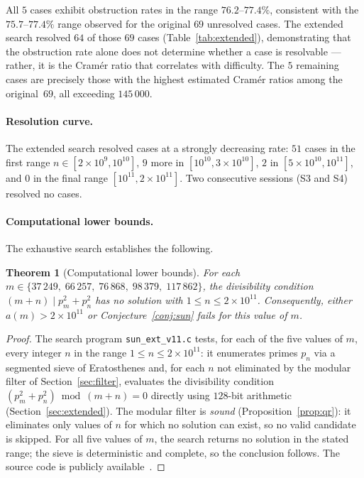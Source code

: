 \documentclass[pdflatex,sn-mathphys-num,Numbered]{sn-jnl}
\theoremstyle{thmstyleone}
\newtheorem{theorem}{Theorem}[section]
\theoremstyle{thmstylethree}
\theoremstyle{thmstyletwo}
\numberwithin{equation}{section}
\begin{document}
All $5$ cases exhibit obstruction rates in the range $76.2$--$77.4\%$,
consistent with the $75.7$--$77.4\%$ range observed for the original
$69$ unresolved cases.
The extended search resolved $64$ of those $69$ cases
(Table~\ref{tab:extended}), demonstrating that the obstruction rate
alone does not determine whether a case is resolvable --- rather, it is
the Cram\'er ratio that correlates with difficulty.
The $5$ remaining cases are precisely those with the highest estimated
Cram\'er ratios among the original~$69$, all exceeding $145\,000$.

\paragraph{Resolution curve.}
The extended search resolved cases at a strongly decreasing rate:
$51$ cases in the first range $n \in [2 \times 10^9, 10^{10}]$,
$9$ more in $[10^{10}, 3 \times 10^{10}]$,
$2$ in $[5 \times 10^{10}, 10^{11}]$,
and $0$ in the final range $[10^{11}, 2 \times 10^{11}]$.
Two consecutive sessions (S3 and S4) resolved no cases.

\paragraph{Computational lower bounds.}
The exhaustive search establishes the following.

\begin{theorem}[Computational lower bounds]\label{thm:lower}
For each $m \in \{37\,249,\; 66\,257,\; 76\,868,\; 98\,379,\;
117\,862\}$, the divisibility condition
$(m+n) \mid p_m^2 + p_n^2$ has no solution with
$1 \leq n \leq 2 \times 10^{11}$.
Consequently, either $a(m) > 2 \times 10^{11}$ or
Conjecture~\textup{\ref{conj:sun}} fails for this value of $m$.
\end{theorem}

\begin{proof}
The search program \texttt{sun\_ext\_v11.c} tests, for each of the
five values of $m$, every integer $n$ in the range
$1 \leq n \leq 2 \times 10^{11}$: it enumerates primes $p_n$ via a
segmented sieve of Eratosthenes and, for each $n$ not eliminated by
the modular filter of Section~\ref{sec:filter}, evaluates the
divisibility condition $(p_m^2 + p_n^2) \bmod (m+n) = 0$ directly
using $128$-bit arithmetic (Section~\ref{sec:extended}).
The modular filter is \emph{sound}
(Proposition~\ref{prop:qr}): it eliminates only values of $n$ for
which no solution can exist, so no valid candidate is skipped.
For all five values of $m$, the search returns no solution in the
stated range; the sieve is deterministic and complete, so the
conclusion follows.
The source code is publicly available~\cite{GithubRepo}.
\end{proof}
\end{document}
